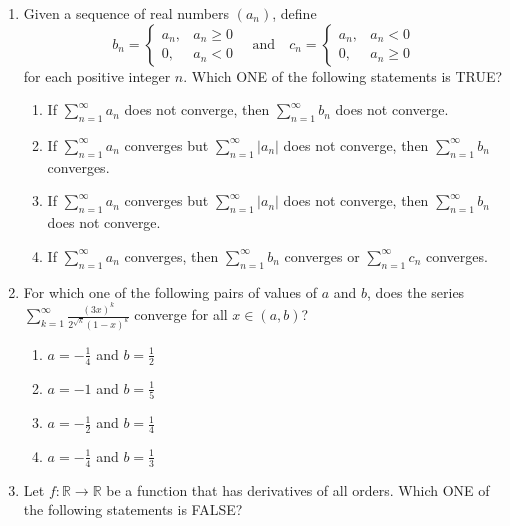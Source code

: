 \begin{enumerate}
\begin{enumerate}[label=(\Alph*)]
\item $\displaystyle\int_0^{\sqrt2}\left(\int_0^{\pi/4}f\,d\theta\right)r\,dr-\int_1^{\sqrt2}\left(\int_0^{\cos^{-1}(1/r)}f\,d\theta\right)r\,dr$
\item $\displaystyle\int_0^{\sqrt2}\left(\int_0^{\pi/4}f\,d\theta\right)r\,dr+\int_1^{\sqrt2}\left(\int_0^{\sin^{-1}(1/r)}f\,d\theta\right)r\,dr$
\item $\displaystyle\int_0^{\sqrt2}\left(\int_0^{\pi/4}f\,d\theta\right)r\,dr-\int_1^{\sqrt2}\left(\int_0^{\sin^{-1}(1/r)}f\,d\theta\right)r\,dr$
\end{enumerate}
\item Given a sequence of real numbers $(a_n)$, define
\[b_n=\begin{cases}a_n,&a_n\ge0\\0,&a_n<0\end{cases}\quad\text{and}\quad
c_n=\begin{cases}a_n,&a_n<0\\0,&a_n\ge0\end{cases}\]
for each positive integer $n$. Which ONE of the following statements is TRUE?
\begin{enumerate}[label=(\Alph*)]
\item If $\sum_{n=1}^\infty a_n$ does not converge, then $\sum_{n=1}^\infty b_n$ does not converge.
\item If $\sum_{n=1}^\infty a_n$ converges but $\sum_{n=1}^\infty |a_n|$ does not converge, then $\sum_{n=1}^\infty b_n$ converges.
\item If $\sum_{n=1}^\infty a_n$ converges but $\sum_{n=1}^\infty |a_n|$ does not converge, then $\sum_{n=1}^\infty b_n$ does not converge.
\item If $\sum_{n=1}^\infty a_n$ converges, then $\sum_{n=1}^\infty b_n$ converges or $\sum_{n=1}^\infty c_n$ converges.
\end{enumerate}
\item For which one of the following pairs of values of $a$ and $b$, does the series
$\displaystyle\sum_{k=1}^\infty \frac{(3x)^k}{2^{\sqrt{k}}(1-x)^k}$
converge for all $x\in(a,b)$?
\begin{enumerate}[label=(\Alph*)]
\item $a=-\frac14$ and $b=\frac12$
\item $a=-1$ and $b=\frac15$
\item $a=-\frac12$ and $b=\frac14$
\item $a=-\frac14$ and $b=\frac13$
\end{enumerate}
\item Let $f:\mathbb R\to\mathbb R$ be a function that has derivatives of all orders. Which ONE of the following statements is FALSE?

\end{enumerate}
